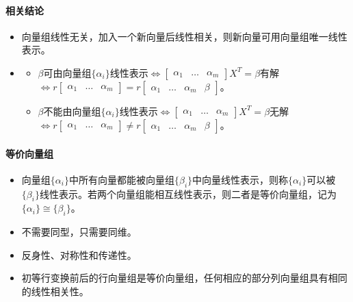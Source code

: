 \documentclass[
12pt, %
a4paper, 
oneside, %
]{scrartcl}
\begin{document}
\paragraph{相关结论}
\begin{itemize}
\item 向量组线性无关，加入一个新向量后线性相关，则新向量可用向量组唯一线性表示。
\item 
\begin{itemize}
\item $ \beta $可由向量组$ \{\alpha_i\} $线性表示$ \Leftrightarrow $$ \begin{bmatrix} \alpha_1 & \dots & \alpha_m \end{bmatrix} X^T = \beta $有解\\$ \Leftrightarrow $$ r \begin{bmatrix} \alpha_1 & \dots & \alpha_m \end{bmatrix} = r \begin{bmatrix} \alpha_1 & \dots & \alpha_m & \beta \end{bmatrix} $。
\item $ \beta $不能由向量组$ \{\alpha_i\} $线性表示$ \Leftrightarrow $$ \begin{bmatrix} \alpha_1 & \dots & \alpha_m \end{bmatrix} X^T = \beta $无解\\$ \Leftrightarrow $$ r \begin{bmatrix} \alpha_1 & \dots & \alpha_m \end{bmatrix} \neq r \begin{bmatrix} \alpha_1 & \dots & \alpha_m & \beta \end{bmatrix} $。
\end{itemize}
\end{itemize}
\paragraph{等价向量组}
\begin{itemize}
\item 向量组$ \{\alpha_i\} $中所有向量都能被向量组$ \{\beta_i\} $中向量线性表示，则称$ \{\alpha_i\} $可以被$ \{\beta_i\} $线性表示。若两个向量组能相互线性表示，则二者是等价向量组，记为$ \{\alpha_i\} \cong \{\beta_i\} $。
\item 不需要同型，只需要同维。
\item 反身性、对称性和传递性。
\item 初等行变换前后的行向量组是等价向量组，任何相应的部分列向量组具有相同的线性相关性。
\end{itemize}
\end{document}
